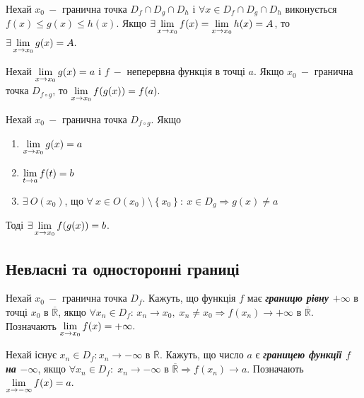 \begin{theorem}
       Нехай $x_0 \: -$ гранична точка $D_f \cap D_g \cap D_h$ і  $\forall x \in D_f \cap D_g \cap D_h$ виконується $f(x) \leqslant  g(x) \leqslant  h(x).$ Якщо $\exists \displaystyle\lim\limits_{x \to x_0} f(x) = \displaystyle\lim\limits_{x \to x_0} h(x) = A$, то $\exists  \displaystyle\lim\limits_{x \to x_0} g(x) = A.$
\end{theorem}

\begin{theorem}
       Нехай $\displaystyle\lim\limits_{x \to x_0} g(x) = a$ і $f \: - $ неперервна функція в точці $a$. Якщо $x_0 \: - $ гранична точка $D_{f \circ g}$, то $\displaystyle\lim\limits_{x \to x_0}f(g(x)) = f(a).$
\end{theorem}

\begin{theorem}
      Нехай $x_0 \: - $ гранична точка $D_{f \circ g}$. Якщо
      \begin{enumerate}
            \item $\displaystyle\lim\limits_{x \to x_0} g(x) = a$
            \item $\displaystyle\lim\limits_{t \to a} f(t) = b$
            \item $\exists \ O(x_0)$, що  $\forall \: x \in O(x_0) \setminus \left \{ x_0 \right \}: \ x \in D_g \Rightarrow g(x) \neq a$
      \end{enumerate}
      Тоді $\exists \displaystyle\lim\limits_{x \to x_0} f(g(x)) = b$.

\end{theorem}
\subsection{\large{Невласні та односторонні границі}}
\begin{definition}[за Гейне] 
        Нехай $x_0 \: - $ гранична точка $D_f$. Кажуть, що функція $f$ має \textcolor{NavyBlue}{\textbf{\textit{{границю рівну $+\infty$ }}}}в точці $x_0$ в $\mathbb{\overline{R}}$, якщо  $\forall x_n \in D_f$: $x_n \to x_0,\; x_n \neq x_0 \Rightarrow f(x_n) \to +\infty$ 
        в $\mathbb{\overline{R}}$. Позначають $\displaystyle\lim\limits_{x \to x_0} f(x) = +\infty.$
\end{definition}

\begin{definition}[за Гейне] 
        Нехай існує $x_n \in D_f: x_n \rightarrow -\infty$ в $\mathbb{\overline{R}}$. Кажуть, що число $a$ є \textcolor{NavyBlue}{\textbf{\textit{{границею функції $f$ \newline  на $-\infty$}}}}, якщо  $\forall x_n \in D_f: \; x_n \to -\infty$ в $\mathbb{\overline{R}} \Rightarrow f(x_n) \to a$. Позначають $\displaystyle\lim\limits_{x \to -\infty} f(x) = a.$
\end{definition}

